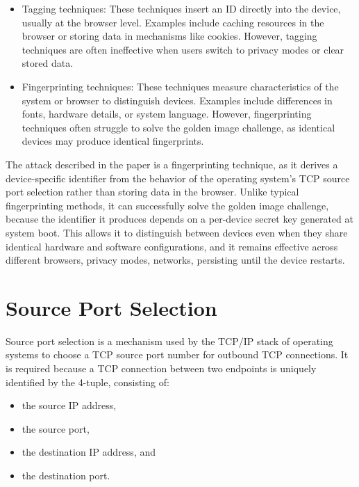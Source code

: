 \documentclass{report}
\begin{document}
\begin{itemize}
    \item \alert{Tagging techniques:} These techniques insert an ID directly into the device, usually at the browser level. Examples include caching resources in the browser or storing data in mechanisms like cookies. However, tagging techniques are often ineffective when users switch to privacy modes or clear stored data.
    
    \item \alert{Fingerprinting techniques:} These techniques measure characteristics of the system or browser to distinguish devices. Examples include differences in fonts, hardware details, or system language. However, fingerprinting techniques often struggle to solve the golden image challenge, as identical devices may produce identical fingerprints.
\end{itemize}

The attack described in the paper is a \alert{fingerprinting technique}, as it derives a device-specific identifier from the behavior of the operating system’s TCP source port selection rather than storing data in the browser. Unlike typical fingerprinting methods, it can successfully solve the \alert{golden image challenge}, because the identifier it produces depends on a per-device secret key generated at system boot. This allows it to distinguish between devices even when they share identical hardware and software configurations, and it remains effective across different browsers, privacy modes, networks, persisting until the device restarts.

\section{Source Port Selection}
\label{sec:source port selection}

Source port selection is a mechanism used by the TCP/IP stack of operating systems to choose a TCP source port number for outbound TCP connections. It is required because a TCP connection between two endpoints is uniquely identified by the \alert{4-tuple}, consisting of:
\begin{itemize}
    \item the \alert{source IP} address,
    \item the \alert{source port},
    \item the \alert{destination IP} address, and
    \item the \alert{destination port}.
\end{itemize}
\end{document}
